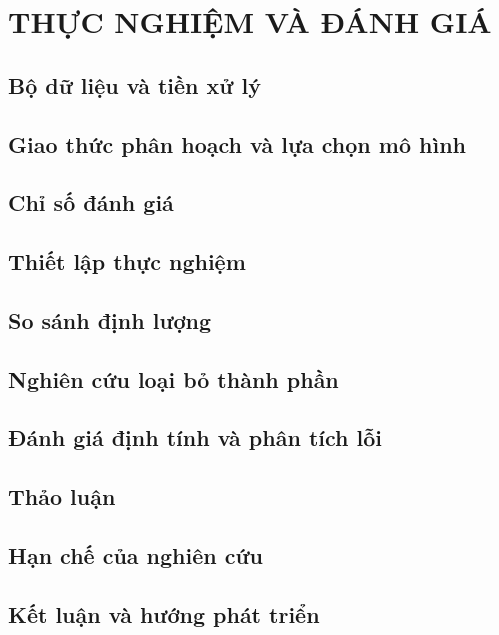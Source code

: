 \chapter{THỰC NGHIỆM VÀ ĐÁNH GIÁ}
\label{chap:experiments}

\section{Bộ dữ liệu và tiền xử lý}
\section{Giao thức phân hoạch và lựa chọn mô hình}
\section{Chỉ số đánh giá}
\section{Thiết lập thực nghiệm}
\section{So sánh định lượng}
\section{Nghiên cứu loại bỏ thành phần}
\section{Đánh giá định tính và phân tích lỗi}
\section{Thảo luận}
\section{Hạn chế của nghiên cứu}
\section{Kết luận và hướng phát triển}
